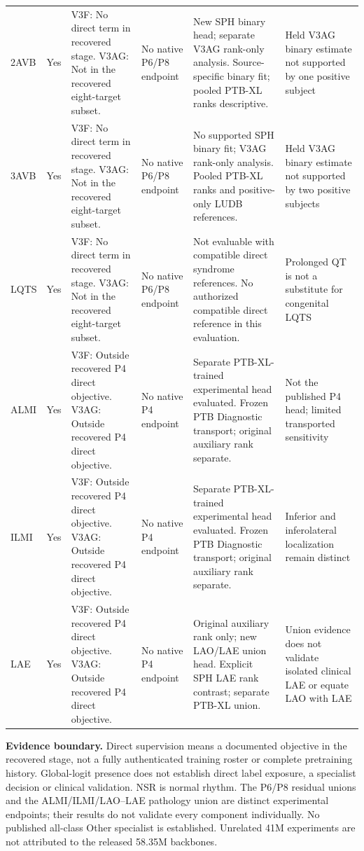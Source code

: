 \documentclass[10pt,a4paper,landscape]{article}
\begin{document}
\begin{longtable}{@{}p{.045\linewidth}p{.035\linewidth}p{.285\linewidth}p{.14\linewidth}p{.25\linewidth}p{.17\linewidth}@{}}
2AVB & Yes & V3F: No direct term in recovered stage. V3AG: Not in the recovered eight-target subset. & No native P6/P8 endpoint & New SPH binary head; separate V3AG rank-only analysis. Source-specific binary fit; pooled PTB-XL ranks descriptive. & Held V3AG binary estimate not supported by one positive subject \\
3AVB & Yes & V3F: No direct term in recovered stage. V3AG: Not in the recovered eight-target subset. & No native P6/P8 endpoint & No supported SPH binary fit; V3AG rank-only analysis. Pooled PTB-XL ranks and positive-only LUDB references. & Held V3AG binary estimate not supported by two positive subjects \\
LQTS & Yes & V3F: No direct term in recovered stage. V3AG: Not in the recovered eight-target subset. & No native P6/P8 endpoint & Not evaluable with compatible direct syndrome references. No authorized compatible direct reference in this evaluation. & Prolonged QT is not a substitute for congenital LQTS \\
ALMI & Yes & V3F: Outside recovered P4 direct objective. V3AG: Outside recovered P4 direct objective. & No native P4 endpoint & Separate PTB-XL-trained experimental head evaluated. Frozen PTB Diagnostic transport; original auxiliary rank separate. & Not the published P4 head; limited transported sensitivity \\
ILMI & Yes & V3F: Outside recovered P4 direct objective. V3AG: Outside recovered P4 direct objective. & No native P4 endpoint & Separate PTB-XL-trained experimental head evaluated. Frozen PTB Diagnostic transport; original auxiliary rank separate. & Inferior and inferolateral localization remain distinct \\
LAE & Yes & V3F: Outside recovered P4 direct objective. V3AG: Outside recovered P4 direct objective. & No native P4 endpoint & Original auxiliary rank only; new LAO/LAE union head. Explicit SPH LAE rank contrast; separate PTB-XL union. & Union evidence does not validate isolated clinical LAE or equate LAO with LAE \\
\end{longtable}
\textbf{Evidence boundary.} Direct supervision means a documented objective in the recovered stage, not a fully authenticated training roster or complete pretraining history. Global-logit presence does not establish direct label exposure, a specialist decision or clinical validation. NSR is normal rhythm. The P6/P8 residual unions and the ALMI/ILMI/LAO--LAE pathology union are distinct experimental endpoints; their results do not validate every component individually. No published all-class Other specialist is established. Unrelated 41M experiments are not attributed to the released 58.35M backbones.
\end{document}
